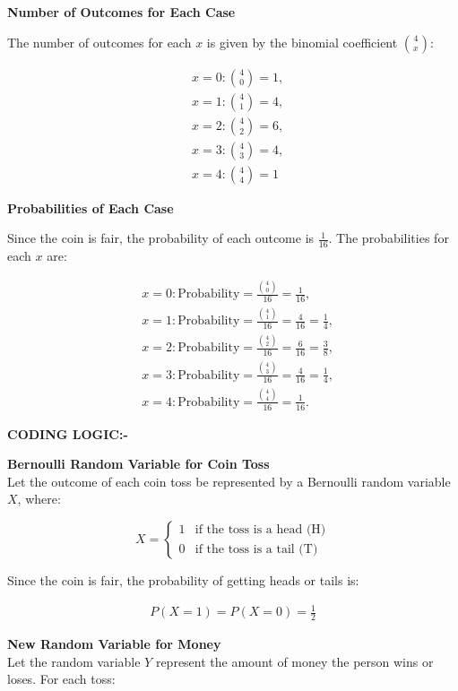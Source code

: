 \documentclass[journal]{IEEEtran}
\numberwithin{equation}{enumi}
\numberwithin{figure}{enumi}
\begin{document}
\textbf{Number of Outcomes for Each Case}

The number of outcomes for each $ x $ is given by the binomial coefficient $ \binom{4}{x} $:

\begin{align}
    &x = 0: \binom{4}{0} = 1, \\
    &x = 1: \binom{4}{1} = 4, \\
    &x = 2: \binom{4}{2} = 6, \\
    &x = 3: \binom{4}{3} = 4, \\
    &x = 4: \binom{4}{4} = 1
\end{align}

\textbf{Probabilities of Each Case}

Since the coin is fair, the probability of each outcome is $ \frac{1}{16} $. The probabilities for each $ x $ are:

\begin{align}
    &x = 0: \text{Probability} = \frac{\binom{4}{0}}{16} = \frac{1}{16}, \\
    &x = 1: \text{Probability} = \frac{\binom{4}{1}}{16} = \frac{4}{16} = \frac{1}{4}, \\
    &x = 2: \text{Probability} = \frac{\binom{4}{2}}{16} = \frac{6}{16} = \frac{3}{8}, \\
    &x = 3: \text{Probability} = \frac{\binom{4}{3}}{16} = \frac{4}{16} = \frac{1}{4}, \\
    &x = 4: \text{Probability} = \frac{\binom{4}{4}}{16} = \frac{1}{16}.
\end{align}


\textbf{CODING LOGIC:-}


\textbf{Bernoulli Random Variable for Coin Toss}\\
Let the outcome of each coin toss be represented by a Bernoulli random variable \( X \), where:

\[
X = 
\begin{cases} 
1 & \text{if the toss is a head (H)} \\
0 & \text{if the toss is a tail (T)}
\end{cases}
\]

Since the coin is fair, the probability of getting heads or tails is:

\begin{align}
P(X = 1) = P(X = 0) = \frac{1}{2}
\end{align}

\textbf{New Random Variable for Money}\\
Let the random variable \( Y \) represent the amount of money the person wins or loses. For each toss:
\end{document}
